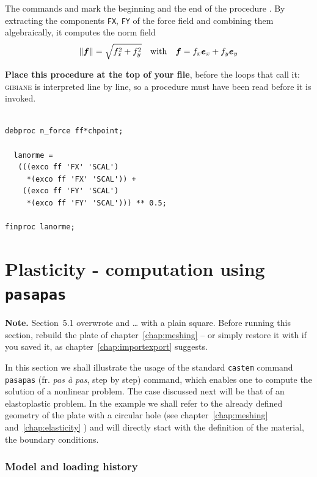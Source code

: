 \begin{castemcom}
The commands  and  mark the beginning and
the end of the procedure . By extracting the components
\texttt{FX}, \texttt{FY} of the force field  and combining them
algebraically, it computes the norm field
\[ \lVert \bm{f}\rVert = \sqrt{f_x^2 + f_y^2}
   \quad \text{with} \quad
   \bm{f} = f_x \bm{e}_x + f_y \bm{e}_y \]

\medskip
\textbf{Place this procedure at the top of your file}, before the loops that
call it: \textsc{gibiane} is interpreted line by line, so a procedure must
have been read before it is invoked.
\end{castemcom}
\begin{castemlines}
\begin{verbatim}

debproc n_force ff*chpoint;
      
  lanorme =
   (((exco ff 'FX' 'SCAL')
     *(exco ff 'FX' 'SCAL')) +
    ((exco ff 'FY' 'SCAL')
     *(exco ff 'FY' 'SCAL'))) ** 0.5;

finproc lanorme; 

\end{verbatim}
\end{castemlines}

\section{Plasticity - computation using \texttt{pasapas} }
\label{sec:plas:pasapas}

\textbf{Note.} Section~5.1 overwrote  and \ldots{}
with a plain square. Before running this section, rebuild the plate of
chapter~\ref{chap:meshing} -- or simply restore it with
 if you saved it, as
chapter~\ref{chap:importexport} suggests.

\medskip
In this section we shall illustrate the usage of the standard \texttt{castem} command 
\texttt{pasapas} (fr. \emph{pas \`a pas}, step by step) command, which enables one to compute the solution of 
a nonlinear problem. The case discussed next will be that of an elastoplastic problem.
In the example we shall refer to the already defined geometry of the plate with a 
circular hole (see chapter~\ref{chap:meshing} and~\ref{chap:elasticity} ) and will directly 
start with the definition of the material, the boundary conditions. 

\subsubsection*{Model and loading history}

